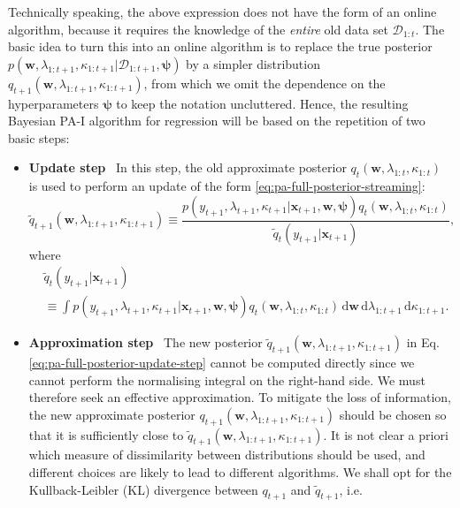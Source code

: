 Technically speaking, the above expression does not have the form of an online algorithm, because it requires the knowledge of the \emph{entire} old data set $\mathcal{D}_{1:t}$. The basic idea to turn this into an online algorithm is to replace the true posterior $p(\mathbf{w}, \lambda_{1:t+1}, \kappa_{1:t+1}|\mathcal{D}_{1:t+1}, \boldsymbol{\psi})$ by a simpler distribution $q_{t+1}(\mathbf{w}, \lambda_{1:t+1}, \kappa_{1:t+1})$, from which we omit the dependence on the hyperparameters $\boldsymbol{\psi}$ to keep the notation uncluttered. Hence, the resulting Bayesian PA-I algorithm for regression will be based on the repetition of two basic steps:
\begin{itemize}
	\item \textbf{Update step} \,
	In this step, the old approximate posterior $q_{t}(\mathbf{w}, \lambda_{1:t}, \kappa_{1:t})$ is used to perform an update of the form \eqref{eq:pa-full-posterior-streaming}:
	\begin{equation}
	\label{eq:pa-full-posterior-update-step}
		\widetilde{q}_{t+1}(\mathbf{w}, \lambda_{1:t+1}, \kappa_{1:t+1})
		\equiv \frac{p(y_{t+1}, \lambda_{t+1}, \kappa_{t+1}|\mathbf{x}_{t+1}, \mathbf{w}, \boldsymbol{\psi})q_{t}(\mathbf{w}, \lambda_{1:t}, \kappa_{1:t})}
		{\widetilde{q}_{t}(y_{t+1}|\mathbf{x}_{t+1})},
	\end{equation}
	where
	\begin{equation}
	\begin{split}
	\label{eq:approximate-marginal-likelihood-contribution}
		& \widetilde{q}_{t}(y_{t+1}|\mathbf{x}_{t+1})
		\\
		&\equiv \int p(y_{t+1}, \lambda_{t+1}, \kappa_{t+1}|\mathbf{x}_{t+1}, \mathbf{w}, \boldsymbol{\psi})q_{t}(\mathbf{w}, \lambda_{1:t}, \kappa_{1:t})
	\,\mathrm{d}\mathbf{w}\,\mathrm{d}\lambda_{1:t+1}\,\mathrm{d}\kappa_{1:t+1}.
	\end{split}
	\end{equation}
	\item \textbf{Approximation step} \,
	The new posterior $\widetilde{q}_{t+1}(\mathbf{w}, \lambda_{1:t+1}, \kappa_{1:t+1})$ in Eq. \eqref{eq:pa-full-posterior-update-step} cannot be computed directly since we cannot perform the normalising integral on the right-hand side. We must therefore seek an effective approximation. 
	To mitigate the loss of information, the new approximate posterior $q_{t+1}(\mathbf{w}, \lambda_{1:t+1}, \kappa_{1:t+1})$ should be chosen so that it is sufficiently close to $\widetilde{q}_{t+1}(\mathbf{w}, \lambda_{1:t+1}, \kappa_{1:t+1})$. It is not clear a priori which measure of dissimilarity between distributions should be used, and different choices are likely to lead to different algorithms. We shall opt for the Kullback-Leibler (KL) divergence between $q_{t+1}$ and $\widetilde{q}_{t+1}$, i.e.\

\end{itemize}

